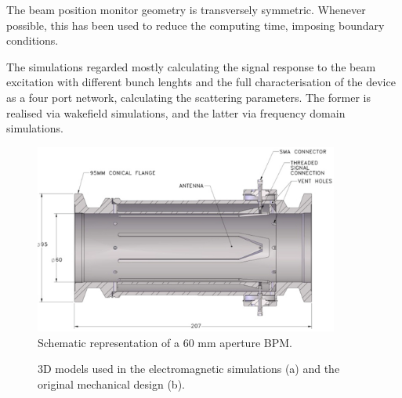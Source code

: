 The beam position monitor geometry is transversely symmetric. Whenever possible, this has been used to reduce the computing time, imposing boundary conditions.

The simulations regarded mostly calculating the signal response to the beam excitation with different bunch lenghts and the full characterisation of the device as a four port network, calculating the scattering parameters. The former is realised via wakefield simulations, and the latter via frequency domain simulations.

\begin{figure}[ht]
\centering
\includegraphics[width=10cm,keepaspectratio]{pictures/tipp_paper}
\caption{Schematic representation of a 60 mm aperture BPM\cite{Shengli:tipp}.}
\label{STEP_tipp}
\end{figure}

\begin{figure}[ht]
\centering
{}
\hspace{3mm}
\caption{3D models used in the electromagnetic simulations (a) and the original mechanical design (b).}
\label{CSTvsSTEP_section}
\end{figure}


